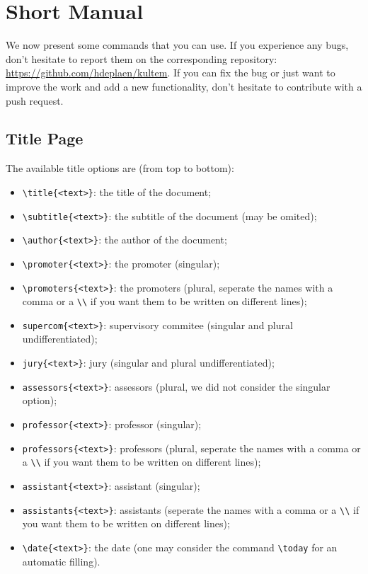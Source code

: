 \documentclass[oneside,a4paper,11pt,explicit]{book}
\begin{document}
\chapter{Short Manual}
\lstset{basicstyle=\ttfamily,breaklines=true}
We now present some commands that you can use. If you experience any bugs, don't hesitate to report them on the corresponding repository: \url{https://github.com/hdeplaen/kultem}. If you can fix the bug or just want to improve the work and add a new functionality, don't hesitate to contribute with a push request.

\section{Title Page}
The available title options are (from top to bottom):
\begin{itemize}
    \item \verb|\title{<text>}|: the title of the document;
    \item \verb|\subtitle{<text>}|: the subtitle of the document (may be omited);
    \item \verb|\author{<text>}|: the author of the document;
    \item \verb|\promoter{<text>}|: the promoter (singular);
    \item \verb|\promoters{<text>}|: the promoters (plural, seperate the names with a comma or a \verb|\\| if you want them to be written on different lines);
    \item \verb|supercom{<text>}|: supervisory commitee  (singular and plural undifferentiated);
    \item \verb|jury{<text>}|: jury (singular and plural undifferentiated);
    \item \verb|assessors{<text>}|: assessors (plural, we did not consider the singular option);
    \item \verb|professor{<text>}|:  professor (singular);
    \item \verb|professors{<text>}|: professors (plural, seperate the names with a comma or a \verb|\\| if you want them to be written on different lines); 
    \item \verb|assistant{<text>}|: assistant (singular);
    \item \verb|assistants{<text>}|: assistants (seperate the names with a comma or a \verb|\\| if you want them to be written on different lines);
    \item \verb|\date{<text>}|: the date (one may consider the command \verb|\today| for an automatic filling).
\end{itemize}
\end{document}
